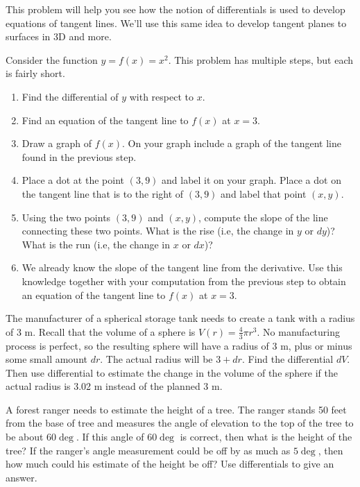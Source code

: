 This problem will help you see how the notion of differentials is used to develop equations of tangent lines. We'll use this same idea to develop tangent planes to surfaces in 3D and more.
\begin{problem} \label{differentials give tangent
    lines}
Consider the function $y=f(x) = x^2$. This problem has multiple steps, but each is fairly short.
\begin{enumerate}
\item Find the differential of $y$ with respect to $x$.  
\item Find an equation of the tangent line to $f(x)$ at $x=3$. 
\item Draw a graph of $f(x)$. On your graph include a graph of the tangent line found in the previous step. 
\item Place a dot at the point $(3,9)$ and label it on your graph. Place a dot on the tangent line that is to the right of $(3,9)$ and label that point $(x,y)$. 
\item Using the two points $(3,9)$ and $(x,y)$, compute the slope of the line connecting these two points. What is the rise (i.e, the change in $y$ or $dy$)? What is the run (i.e, the change in $x$ or $dx$)?  
\item We already know the slope of the tangent line from the derivative. Use this knowledge together with your computation from the previous step to obtain an equation of the tangent line to $f(x)$ at $x=3$. 
\end{enumerate}
\end{problem}
 
\begin{problem}  \label{diff-sphere}
The manufacturer of a spherical storage tank needs to create a tank with a radius of 3 m. Recall that the volume of a sphere is $V(r) = \frac{4}{3}\pi r^3$. No manufacturing process is perfect, so the resulting sphere will have a radius of 3 m, plus or minus some small amount $dr$. The actual radius will be $3+dr$. Find the differential $dV$.  Then use differential to estimate the change in the volume of the sphere if the actual radius is 3.02 m instead of the planned 3 m.    
\end{problem}
 
\begin{problem}
A forest ranger needs to estimate the height of a tree.  The ranger stands 50 feet from the base of tree and measures the angle of elevation to the top of the tree to be about 60$\deg$. If this angle of 60$\deg$ is correct, then what is the height of the tree? If the ranger's angle measurement could be off by as much as $5 \deg$, then how much could his estimate of the height be off? Use differentials to give an answer.
\end{problem}




